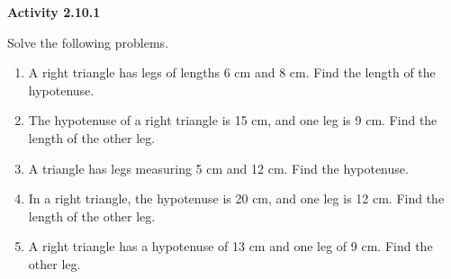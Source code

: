  \vspace{1ex}
\noindent\textbf{Activity 2.10.1}


Solve the following problems. 
\begin{enumerate}[noitemsep, label = \color{blue}\arabic*. ]
    \item A right triangle has legs of lengths 6 cm and 8 cm. Find the length of the hypotenuse.
    \item The hypotenuse of a right triangle is 15 cm, and one leg is 9 cm. Find the length of the other leg.
    \item A triangle has legs measuring 5 cm and 12 cm. Find the hypotenuse.
    \item In a right triangle, the hypotenuse is 20 cm, and one leg is 12 cm. Find the length of the other leg.
    \item A right triangle has a hypotenuse of 13 cm and one leg of 9 cm. Find the other leg.
\end{enumerate}

 
